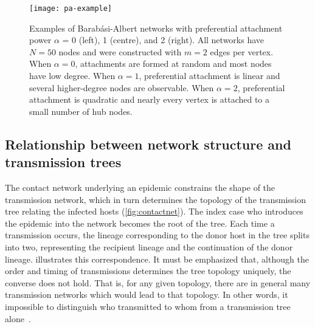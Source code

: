 \begin{figure}
  \texttt{[image: pa-example]}
  \caption[
    Examples of Barab\'asi-Albert networks with preferential attachment power
    $\alpha$ = 0, 1, and 2.
  ]{
    Examples of Barab\'asi-Albert networks with preferential attachment power
    $\alpha$ = 0 (left), 1 (centre), and 2 (right). All networks have $N = 50$
    nodes and were constructed with $m = 2$ edges per vertex. When $\alpha =
    0$, attachments are formed at random and most nodes have low degree. When
    $\alpha = 1$, preferential attachment is linear and several higher-degree
    nodes are observable. When $\alpha = 2$, preferential attachment is
    quadratic and nearly every vertex is attached to a small number of hub
    nodes.
  }
  \label{fig:baeg}
\end{figure}

\subsection{Relationship between network structure and transmission trees}

The contact network underlying an epidemic constrains the shape of the
transmission network, which in turn determines the topology of the transmission
tree relating the infected hosts (\cref{fig:contactnet}). The index case who
introduces the epidemic into the network becomes the root of the tree. Each
time a transmission occurs, the lineage corresponding to the donor host in the
tree splits into two, representing the recipient lineage and the continuation
of the donor lineage.  illustrates this correspondence.
It must be emphasized that, although the order and timing of transmissions
determines the tree topology uniquely, the converse does not hold. That is, for
any given topology, there are in general many transmission networks which would
lead to that topology. In other words, it impossible to distinguish who
transmitted to whom from a transmission tree alone~\autocite{bernard2007hiv}.

